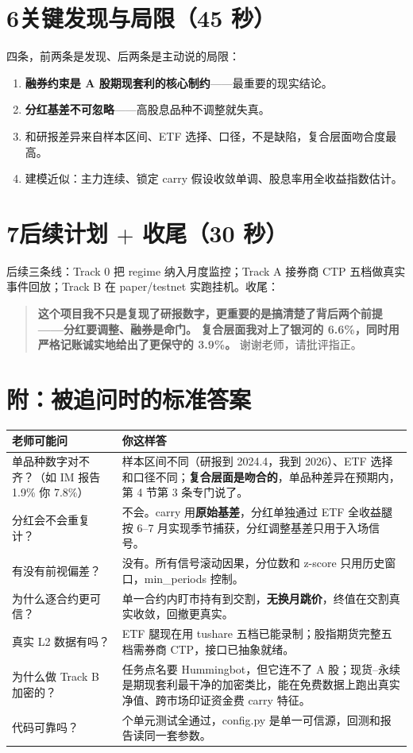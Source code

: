 \documentclass[11pt]{ctexart}
\newcommand{\cue}[1]{{\color{cue}\textbf{【#1】}}}
\begin{document}
\section*{6\quad 关键发现与局限（45 秒）\quad \cue{第 4 节}}
四条，前两条是发现、后两条是主动说的局限：
\begin{enumerate}
  \item \textbf{融券约束是 A 股期现套利的核心制约}——最重要的现实结论。
  \item \textbf{分红基差不可忽略}——高股息品种不调整就失真。
  \item 和研报差异来自样本区间、ETF 选择、口径，不是缺陷，复合层面吻合度最高。
  \item 建模近似：主力连续、锁定 carry 假设收敛单调、股息率用全收益指数估计。
\end{enumerate}

\section*{7\quad 后续计划 $+$ 收尾（30 秒）\quad \cue{第 5 节}}
后续三条线：Track 0 把 regime 纳入月度监控；Track A 接券商 CTP 五档做真实事件回放；Track B 在
paper/testnet 实跑挂机。收尾：
\begin{quote}
\textbf{这个项目我不只是复现了研报数字，更重要的是搞清楚了背后两个前提——分红要调整、融券是命门。
复合层面我对上了银河的 6.6\%，同时用严格记账诚实地给出了更保守的 3.9\%。} 谢谢老师，请批评指正。
\end{quote}

\section*{附：被追问时的标准答案}
\small
\begin{tabular}{>{\raggedright\arraybackslash}p{4.6cm} >{\raggedright\arraybackslash}p{10.5cm}}
\toprule
老师可能问 & 你这样答 \\
\midrule
单品种数字对不齐？（如 IM 报告 1.9\% 你 7.8\%） & 样本区间不同（研报到 2024.4，我到 2026）、ETF 选择和口径不同；\textbf{复合层面是吻合的}，单品种差异在预期内，第 4 节第 3 条专门说了。 \\
分红会不会重复计？ & 不会。carry 用\textbf{原始基差}，分红单独通过 ETF 全收益腿按 6--7 月实现季节捕获，分红调整基差只用于入场信号。 \\
有没有前视偏差？ & 没有。所有信号滚动因果，分位数和 z-score 只用历史窗口，min\_periods 控制。 \\
为什么逐合约更可信？ & 单一合约内盯市持有到交割，\textbf{无换月跳价}，终值在交割真实收敛，回撤更真实。 \\
真实 L2 数据有吗？ & ETF 腿现在用 tushare 五档已能录制；股指期货完整五档需券商 CTP，接口已抽象就绪。 \\
为什么做 Track B 加密的？ & 任务点名要 Hummingbot，但它连不了 A 股；现货--永续是期现套利最干净的加密类比，能在免费数据上跑出真实净值、跨市场印证资金费 carry 特征。 \\
代码可靠吗？ & 41 个单元测试全通过，config.py 是单一可信源，回测和报告读同一套参数。 \\
\bottomrule
\end{tabular}
\end{document}
